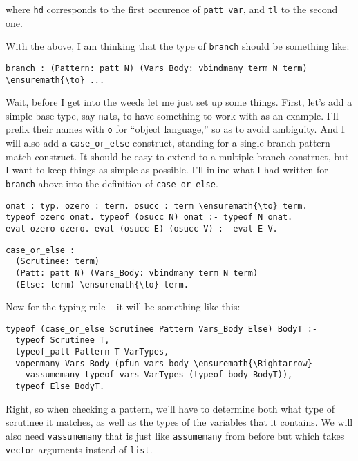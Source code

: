 where \texttt{hd} corresponds to the first occurence of
\texttt{patt\_var}, and \texttt{tl} to the second one.

With the above, I am thinking that the type of \texttt{branch} should be
something like:

\begin{verbatim}
branch : (Pattern: patt N) (Vars_Body: vbindmany term N term) \ensuremath{\to} ...
\end{verbatim}

Wait, before I get into the weeds let me just set up some things. First,
let's add a simple base type, say \texttt{nat}s, to have something to
work with as an example. I'll prefix their names with \texttt{o} for
``object language,'' so as to avoid ambiguity. And I will also add a
\texttt{case\_or\_else} construct, standing for a single-branch
pattern-match construct. It should be easy to extend to a
multiple-branch construct, but I want to keep things as simple as
possible. I'll inline what I had written for \texttt{branch} above into
the definition of \texttt{case\_or\_else}.

\begin{verbatim}
onat : typ. ozero : term. osucc : term \ensuremath{\to} term.
typeof ozero onat. typeof (osucc N) onat :- typeof N onat.
eval ozero ozero. eval (osucc E) (osucc V) :- eval E V.
\end{verbatim}

\begin{verbatim}
case_or_else :
  (Scrutinee: term)
  (Patt: patt N) (Vars_Body: vbindmany term N term)
  (Else: term) \ensuremath{\to} term.
\end{verbatim}

Now for the typing rule -- it will be something like this:

\begin{verbatim}
typeof (case_or_else Scrutinee Pattern Vars_Body Else) BodyT :-
  typeof Scrutinee T,
  typeof_patt Pattern T VarTypes,
  vopenmany Vars_Body (pfun vars body \ensuremath{\Rightarrow}
    vassumemany typeof vars VarTypes (typeof body BodyT)),
  typeof Else BodyT.
\end{verbatim}

Right, so when checking a pattern, we'll have to determine both what
type of scrutinee it matches, as well as the types of the variables that
it contains. We will also need \texttt{vassumemany} that is just like
\texttt{assumemany} from before but which takes \texttt{vector}
arguments instead of \texttt{list}.

